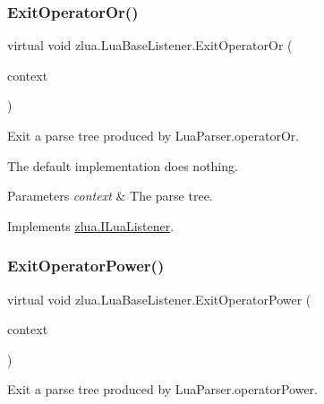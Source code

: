 \subsubsection{\texorpdfstring{Exit\+Operator\+Or()}{ExitOperatorOr()}}
{\footnotesize\ttfamily virtual void zlua.\+Lua\+Base\+Listener.\+Exit\+Operator\+Or (\begin{DoxyParamCaption}\item[{\mbox{[}\+Not\+Null\mbox{]} \mbox{\hyperlink{classzlua_1_1_lua_parser_1_1_operator_or_context}{Lua\+Parser.\+Operator\+Or\+Context}}}]{context }\end{DoxyParamCaption})\hspace{0.3cm}{\ttfamily [virtual]}}



Exit a parse tree produced by Lua\+Parser.\+operator\+Or. 

The default implementation does nothing.


\begin{DoxyParams}{Parameters}
{\em context} & The parse tree.\\
\hline
\end{DoxyParams}


Implements \mbox{\hyperlink{interfacezlua_1_1_i_lua_listener_adf5acf7049bb52ab0840b23bd5038a0a}{zlua.\+I\+Lua\+Listener}}.

\mbox{\label{classzlua_1_1_lua_base_listener_aed60ef8f2e3a221a83c9b5be20dcc8c0}} 
\subsubsection{\texorpdfstring{Exit\+Operator\+Power()}{ExitOperatorPower()}}
{\footnotesize\ttfamily virtual void zlua.\+Lua\+Base\+Listener.\+Exit\+Operator\+Power (\begin{DoxyParamCaption}\item[{\mbox{[}\+Not\+Null\mbox{]} \mbox{\hyperlink{classzlua_1_1_lua_parser_1_1_operator_power_context}{Lua\+Parser.\+Operator\+Power\+Context}}}]{context }\end{DoxyParamCaption})\hspace{0.3cm}{\ttfamily [virtual]}}



Exit a parse tree produced by Lua\+Parser.\+operator\+Power. 


